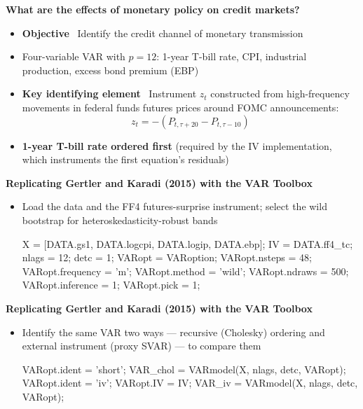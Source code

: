 \documentclass[10pt,handout]{beamer}
\begin{document}

\begin{frame}
{\textbf{What are the effects of monetary policy on credit markets?}}
\begin{itemize}
\item \textbf{Objective} \ Identify the credit channel of monetary transmission\bigskip\pause
\item Four-variable VAR with $p=12$: 1-year T-bill rate, CPI, industrial production, excess bond premium (EBP)\bigskip
\item \textbf{Key identifying element} \ Instrument $z_t$ constructed from high-frequency movements in federal funds futures prices around FOMC announcements:
\begin{equation*}
z_t = -(P_{t,\tau+20} - P_{t,\tau-10})
\end{equation*}
\item \textbf{1-year T-bill rate ordered first} (required by the IV implementation, which instruments the first equation's residuals)
\end{itemize}
\end{frame}


\begin{frame}[fragile]
{\textbf{Replicating Gertler and Karadi (2015) with the VAR Toolbox}}
\begin{itemize}
\item Load the data and the FF4 futures-surprise instrument; select the wild bootstrap for heteroskedasticity-robust bands
\par\smallskip
\begin{matlabcode}
X  = [DATA.gs1, DATA.logcpi, DATA.logip, DATA.ebp];
IV = DATA.ff4_tc;  %
nlags = 12;  detc = 1;
VARopt = VARoption;
VARopt.nsteps    = 48;
VARopt.frequency = 'm';
VARopt.method    = 'wild';
VARopt.ndraws    = 500;
VARopt.inference = 1;
VARopt.pick      = 1;
\end{matlabcode}
\end{itemize}
\end{frame}


\begin{frame}[fragile]
{\textbf{Replicating Gertler and Karadi (2015) with the VAR Toolbox}}
\begin{itemize}
\item Identify the same VAR two ways --- recursive (Cholesky) ordering and external instrument (proxy SVAR) --- to compare them
\par\smallskip
\begin{matlabcode}
VARopt.ident     = 'short';
VAR_chol = VARmodel(X, nlags, detc, VARopt);
VARopt.ident     = 'iv';
VARopt.IV        = IV;
VAR_iv   = VARmodel(X, nlags, detc, VARopt);
\end{matlabcode}
\end{itemize}
\end{frame}
\end{document}
